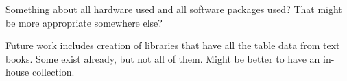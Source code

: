 Something about all hardware used and all software packages used? 
That might be more appropriate somewhere else?

Future work includes creation of libraries that have all the table 
data from text books. Some exist already, but not all of them. Might 
be better to have an in-house collection.